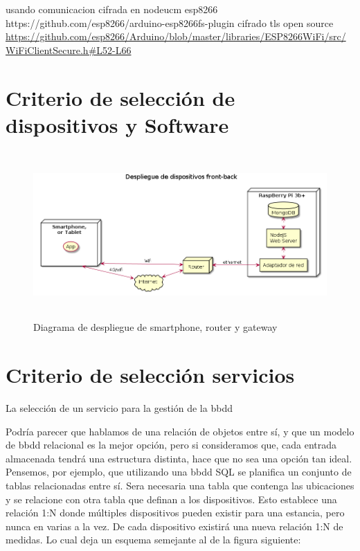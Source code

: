 usando comunicacion cifrada en nodeucm esp8266
https://github.com/esp8266/arduino-esp8266fs-plugin
cifrado tls open source
\url{https://github.com/esp8266/Arduino/blob/master/libraries/ESP8266WiFi/src/WiFiClientSecure.h#L52-L66}


\section{Criterio de selección de dispositivos y Software}
\label{makereference4.4}

\begin{figure}[hbt!]
\centering
\includegraphics[height=2.5in]{figures/diagrams/physical-devices/front-back.png}
\caption[Despligue de front]{Diagrama de despliegue de smartphone, router y gateway\footnotemark}
\end{figure}

\section{Criterio de selección servicios}
\label{makereference4.5}
La selección de un servicio para la gestión de la \gls{bbdd}


Podría parecer que hablamos de una relación de objetos entre sí, y que un modelo de \gls{bbdd} relacional es la mejor opción, pero si consideramos que, cada entrada almacenada tendrá una estructura distinta, hace que no sea una opción tan ideal. Pensemos, por ejemplo, que utilizando una \gls{bbdd} SQL se planifica un conjunto de tablas relacionadas entre sí. Sera necesaria una tabla que contenga las ubicaciones y se relacione con otra tabla que definan a los dispositivos. Esto establece una relación 1:N donde múltiples dispositivos pueden existir para una estancia, pero nunca en varias a la vez. De cada dispositivo existirá una nueva relación 1:N de medidas. Lo cual deja un esquema semejante al de la figura siguiente:


